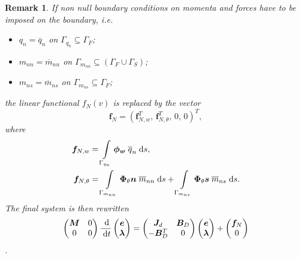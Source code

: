 \documentclass{ifacconf}
\newtheorem{remark}{Remark}
\begin{document}
\begin{remark}
If non null boundary conditions on momenta and forces have to be imposed on the boundary, i.e.
\begin{itemize}
	\item $q_n = \overline{q}_n$ on $\Gamma_{q_n} \subseteq \Gamma_{F}$;
	\item $m_{nn} = \overline{m}_{nn}$ on $\Gamma_{m_{nn}} \subseteq (\Gamma_{F} \cup \Gamma_{S})$;
    \item $m_{ns} = \overline{m}_{ns}$ on $\Gamma_{m_{ns}} \subseteq \Gamma_{F}$;
\end{itemize}

 the linear functional $f_N(v)$ is replaced by the vector
\begin{equation}
\bm{f}_N = (\bm{f}_{N, w}^T,\, \bm{f}_{N, \theta}^T,\, 0, \, 0 )^T,
\end{equation}
where 
\begin{equation}
\begin{aligned}
\bm{f}_{N, w} &= \int_{\Gamma_{q_n}} \bm{\phi_w} \; \overline{q}_n \d{s}, \\
\bm{f}_{N, \theta} &= \int_{\Gamma_{m_{nn}}} \bm{\Phi}_{\theta} \bm{n} \; \overline{m}_{nn} \d{s}  + \int_{\Gamma_{m_{ns}}} \bm{\Phi}_{\theta} \bm{s} \; \overline{m}_{ns} \d{s}. \\
\end{aligned}
\end{equation}
The final system is then rewritten
\begin{equation}
\begin{pmatrix}
\bm{M} & 0 \\
0      & 0 \\
\end{pmatrix} \frac{\d}{\d t}
\begin{pmatrix}
\bm{e}\\
\bm{\lambda} \\
\end{pmatrix}
= \begin{pmatrix}
\bm{J}_d & \bm{B}_D\\
-\bm{B}_D^T & 0 \\
\end{pmatrix}
\begin{pmatrix}
\bm{e}\\
\bm{\lambda} \\
\end{pmatrix} + 
\begin{pmatrix}
\bm{f}_N\\
0\\
\end{pmatrix}
\end{equation}.
\end{remark}
\end{document}
